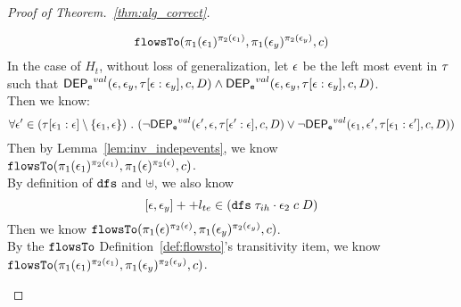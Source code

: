 \begin{proof}[Proof of Theorem.~\ref{thm:alg_correct}]
\begin{case}
\begin{subcase}
\begin{subsubcase}
\begin{subproof}
    \[
      \mathtt{flowsTo}(\pi_1(\mathtt{\epsilon}_1)^{\pi_2(\mathtt{\epsilon}_1)}, \pi_1(\mathtt{\epsilon}_y)^{\pi_2(\mathtt{\epsilon}_y)}, c)
    \]
  In the case of $H_t$, without loss of generalization, let $\mathtt{\epsilon}$ be the left most event in $\mathtt{\tau}$ such that 
  $\mathsf{DEP_{\mathtt{e}}}^{val} (\mathtt{\epsilon}, \mathtt{\epsilon}_y, \mathtt{\tau}[\mathtt{\epsilon}:\mathtt{\epsilon}_y], c, D) \land \mathsf{DEP_{\mathtt{e}}}^{val} (\mathtt{\epsilon}, \mathtt{\epsilon}_y, \mathtt{\tau}[\mathtt{\epsilon}:\mathtt{\epsilon}_y], c, D)$.
  \\
 Then we know:
  \[
    \forall \mathtt{\epsilon}' \in (\mathtt{\tau}[\mathtt{\epsilon}_1:\mathtt{\epsilon}]\setminus \{\mathtt{\epsilon}_1, \mathtt{\epsilon}\}) 
    ~.~ 
    (\neg \mathsf{DEP_{\mathtt{e}}}^{val} (\mathtt{\epsilon}', \mathtt{\epsilon}, \mathtt{\tau}[\mathtt{\epsilon}':\mathtt{\epsilon}], c, D)
    \lor 
    \neg \mathsf{DEP_{\mathtt{e}}}^{val} (\mathtt{\epsilon}_1, \mathtt{\epsilon}', \mathtt{\tau}[\mathtt{\epsilon}_1: \mathtt{\epsilon}'], c, D))
  \]
Then by Lemma~\ref{lem:inv_indepevents}, we know  $\mathtt{flowsTo}(\pi_1(\mathtt{\epsilon}_1)^{\pi_2(\mathtt{\epsilon}_1)}, \pi_1(\mathtt{\epsilon})^{\pi_2(\mathtt{\epsilon})}, c)$.
\\
  By definition of $\mathtt{dfs}$ and $\uplus$, we also know 
  \[ 
    [\mathtt{\epsilon}, \mathtt{\epsilon}_y] ++ l_{te} \in (\mathtt{dfs} \; {\mathtt{\tau}_{ih} \cdot \mathtt{\epsilon}_2} \; c \; D )
  \]
  Then we know $\mathtt{flowsTo}(\pi_1(\mathtt{\epsilon})^{\pi_2(\mathtt{\epsilon})}, \pi_1(\mathtt{\epsilon}_y)^{\pi_2(\mathtt{\epsilon}_y)}, c)$.
%
\\
By the $\mathtt{flowsTo}$ Definition~\ref{def:flowsto}'s transitivity item, we know $\mathtt{flowsTo}(\pi_1(\mathtt{\epsilon}_1)^{\pi_2(\mathtt{\epsilon}_1)}, \pi_1(\mathtt{\epsilon}_y)^{\pi_2(\mathtt{\epsilon}_y)}, c)$.


\end{subproof}
\end{subsubcase}
\end{subcase}
\end{case}
\end{proof}
